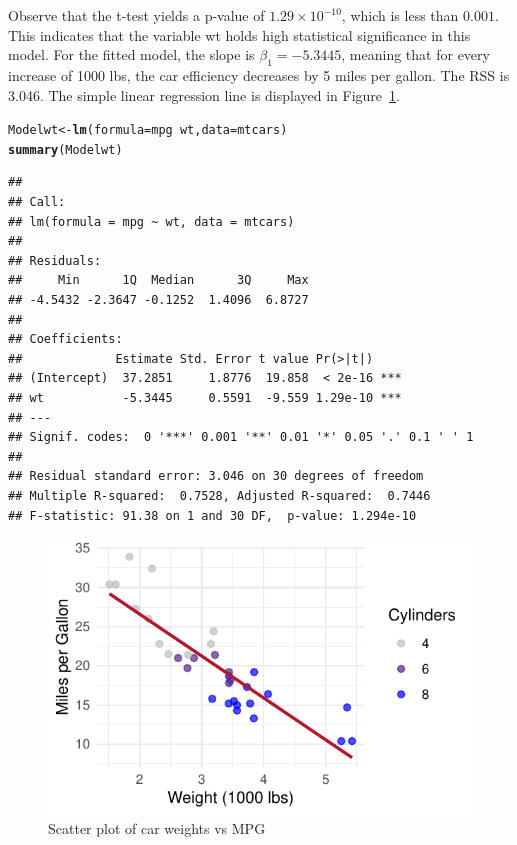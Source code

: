 \documentclass{article}\usepackage[]{graphicx}\usepackage[]{xcolor}
\makeatletter
\def\maxwidth{ %
  \ifdim\Gin@nat@width>\linewidth
    \linewidth
  \else
    \Gin@nat@width
  \fi
}
\newcommand{\hlopt}[1]{\textcolor[rgb]{0,0,0}{#1}}%
\newcommand{\hlstd}[1]{\textcolor[rgb]{0.345,0.345,0.345}{#1}}%
\newcommand{\hlkwb}[1]{\textcolor[rgb]{0.69,0.353,0.396}{#1}}%
\newcommand{\hlkwc}[1]{\textcolor[rgb]{0.333,0.667,0.333}{#1}}%
\newcommand{\hlkwd}[1]{\textcolor[rgb]{0.737,0.353,0.396}{\textbf{#1}}}%
\newenvironment{kframe}{%
 \def\at@end@of@kframe{}%
 \ifinner\ifhmode%
  \def\at@end@of@kframe{\end{minipage}}%
  \begin{minipage}{\columnwidth}%
 \fi\fi%
 \def\FrameCommand##1{\hskip\@totalleftmargin \hskip-\fboxsep
 \colorbox{shadecolor}{##1}\hskip-\fboxsep
     \hskip-\linewidth \hskip-\@totalleftmargin \hskip\columnwidth}%
 \MakeFramed {\advance\hsize-\width
   \@totalleftmargin\z@ \linewidth\hsize
   \@setminipage}}%
 {\par\unskip\endMakeFramed%
 \at@end@of@kframe}
\newenvironment{knitrout}{}{} %
\numberwithin{equation}{section}
\makeatother
\begin{document}
\noindent
Observe that the t-test yields a p-value of $1.29 \times 10^{-10}$, which is less than $0.001$. This indicates that the variable wt holds high statistical significance in this model. For the fitted model, the slope is $\beta_1 = -5.3445$, meaning that for every increase of 1000 lbs, the car efficiency decreases by 5 miles per gallon. The RSS is 3.046. The simple linear regression line is displayed in Figure~\ref{fig:scatter-plot}.

\begin{knitrout}\scriptsize
{}\color{fgcolor}\begin{kframe}
\begin{alltt}
\hlstd{Modelwt} \hlkwb{<-} \hlkwd{lm}\hlstd{(}\hlkwc{formula} \hlstd{= mpg} \hlopt{~} \hlstd{wt,} \hlkwc{data} \hlstd{= mtcars)}
\hlkwd{summary}\hlstd{(Modelwt)}
\end{alltt}
\begin{verbatim}
## 
## Call:
## lm(formula = mpg ~ wt, data = mtcars)
## 
## Residuals:
##     Min      1Q  Median      3Q     Max 
## -4.5432 -2.3647 -0.1252  1.4096  6.8727 
## 
## Coefficients:
##             Estimate Std. Error t value Pr(>|t|)    
## (Intercept)  37.2851     1.8776  19.858  < 2e-16 ***
## wt           -5.3445     0.5591  -9.559 1.29e-10 ***
## ---
## Signif. codes:  0 '***' 0.001 '**' 0.01 '*' 0.05 '.' 0.1 ' ' 1
## 
## Residual standard error: 3.046 on 30 degrees of freedom
## Multiple R-squared:  0.7528,	Adjusted R-squared:  0.7446 
## F-statistic: 91.38 on 1 and 30 DF,  p-value: 1.294e-10
\end{verbatim}
\end{kframe}
\end{knitrout}

\begin{knitrout}\scriptsize
{}\color{fgcolor}\begin{figure}[H]

{\centering \includegraphics[width=\maxwidth]{figure/beamer-scatter-plot-1} 

}

\caption[Scatter plot of car weights vs MPG]{Scatter plot of car weights vs MPG}\label{fig:scatter-plot}
\end{figure}

\end{knitrout}
\end{document}
